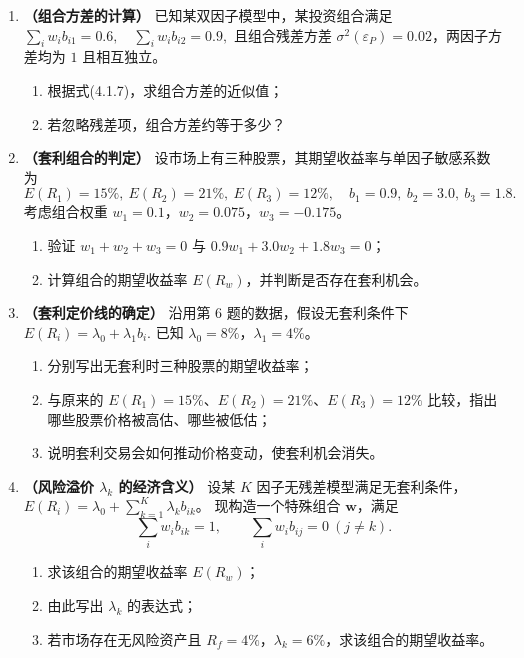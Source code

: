 \documentclass{article}
\begin{document}
\begin{enumerate}[label=\textbf{\arabic*.}]
\item \textbf{（组合方差的计算）}
已知某双因子模型中，某投资组合满足
\(
\sum_{i} w_i b_{i1}=0.6,\quad \sum_{i} w_i b_{i2}=0.9,
\) 
且组合残差方差 $\sigma^2(\varepsilon_P)=0.02$，两因子方差均为 $1$ 且相互独立。
\begin{enumerate}[label=(\arabic*)]
    \item 根据式(4.1.7)，求组合方差的近似值；
    \item 若忽略残差项，组合方差约等于多少？
\end{enumerate}

\item \textbf{（套利组合的判定）}
设市场上有三种股票，其期望收益率与单因子敏感系数为
\[
E(R_1)=15\%,\ E(R_2)=21\%,\ E(R_3)=12\%, \quad 
b_1=0.9,\ b_2=3.0,\ b_3=1.8.
\]
考虑组合权重 $w_1=0.1$，$w_2=0.075$，$w_3=-0.175$。
\begin{enumerate}[label=(\arabic*)]
    \item 验证 $w_1+w_2+w_3=0$ 与 $0.9w_1+3.0w_2+1.8w_3=0$；
    \item 计算组合的期望收益率 $E(R_w)$，并判断是否存在套利机会。
\end{enumerate}

\item \textbf{（套利定价线的确定）}
沿用第 6 题的数据，假设无套利条件下
\(
E(R_i)=\lambda_0+\lambda_1 b_i. 
\)
已知 $\lambda_0=8\%$，$\lambda_1=4\%$。
\begin{enumerate}[label=(\arabic*)]
    \item 分别写出无套利时三种股票的期望收益率；
    \item 与原来的 $E(R_1)=15\%$、$E(R_2)=21\%$、$E(R_3)=12\%$ 比较，指出哪些股票价格被高估、哪些被低估；
    \item 说明套利交易会如何推动价格变动，使套利机会消失。
\end{enumerate}

\item \textbf{（风险溢价 $\lambda_k$ 的经济含义）}
设某 $K$ 因子无残差模型满足无套利条件，$E(R_i)=\lambda_0+\sum_{k=1}^{K}\lambda_k b_{ik}$。
现构造一个特殊组合 $\mathbf{w}$，满足
\[
\sum_i w_i b_{ik}=1,\qquad \sum_i w_i b_{ij}=0\ (j\neq k).
\]
\begin{enumerate}[label=(\arabic*)]
    \item 求该组合的期望收益率 $E(R_w)$；
    \item 由此写出 $\lambda_k$ 的表达式；
    \item 若市场存在无风险资产且 $R_f=4\%$，$\lambda_k=6\%$，求该组合的期望收益率。
\end{enumerate}


\end{enumerate}
\end{document}
